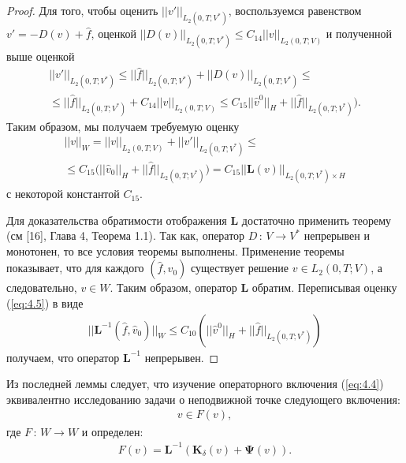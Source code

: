 \documentclass[14pt, a4paper]{extarticle}
\numberwithin{equation}{section}
\begin{document}
\begin{proof}
        Для того, чтобы оценить $||v'||_{L_2(0,T;V^*)}$, воспользуемся равенством $v' = -D(v) + \hat{f}$,
        оценкой $||D(v)||_{L_2(0,T;V^*)} \leq C_{14} ||v||_{L_2(0,T;V)}$ и полученной выше оценкой
        \begin{equation*}
            \begin{gathered}
                ||v'||_{L_2(0,T;V^*)} \leq ||\hat{f}||_{L_2(0,T;V^*)} + ||D(v)||_{L_2(0,T;V^*)} \leq\\
                \leq ||\hat{f}||_{L_2(0,T;V^*)} + C_{14}||v||_{L_2(0,T;V)} \leq
                C_{15}||\hat{v}^0||_H + ||\hat{f}||_{L_2(0,T;V^*)}).
            \end{gathered}
        \end{equation*}
        Таким образом, мы получаем требуемую оценку
        \begin{equation*}
            \begin{gathered}
                ||v||_W = ||v||_{L_2(0,T;V)} + ||v'||_{L_2(0,T;V^*)} \leq\\
                \leq C_{15}\bigg(||\hat{v}_0||_H + ||\hat{f}||_{L_2(0,T;V^*)}\bigg) =
                C_{15}||\boldsymbol{L}(v)||_{L_2(0,T;V^*) \times H}
            \end{gathered}
        \end{equation*}
        \noindent с некоторой константой $C_{15}$.

        Для доказательства обратимости отображения $\boldsymbol{L}$ достаточно применить теорему
        (см [16], Глава 4, Теорема 1.1). Так как, оператор $D\, : \,V \rightarrow V^*$ непрерывен и монотонен,
        то все условия теоремы выполнены. Применение теоремы показывает, что для каждого $(\hat{f}, \hat{v}_0)$
        существует решение $v \in L_2(0,T;V)$, а следовательно, $v \in W$. Таким образом,
        оператор $\boldsymbol{L}$ обратим. Переписывая оценку (\ref{eq:4.5}) в виде
        \begin{equation*}
            \begin{gathered}
                ||\boldsymbol{L}^{-1}(\hat{f}, \hat{v}_0)||_W \leq C_{10}(||\hat{v}^0||_H + ||\hat{f}||_{L_2(0,T;V^*)})
            \end{gathered}
        \end{equation*}
        \noindent получаем, что оператор $\boldsymbol{L}^{-1}$ непрерывен.
    \end{proof}

    Из последней леммы следует, что изучение операторного включения (\ref{eq:4.4}) эквивалентно 
    исследованию задачи о неподвижной точке следующего включения:
    \begin{equation}\label{eq:4.6}
        \begin{gathered}
            v \in F(v),
        \end{gathered}
    \end{equation}
    \noindent где $F\, : \,W\rightarrow W$ и определен:
    \begin{equation*}
        \begin{gathered}
            F(v) = \boldsymbol{L}^{-1} (\boldsymbol{K}_\delta(v) + \boldsymbol{\Psi}(v)).
        \end{gathered}
    \end{equation*}
\end{document}
